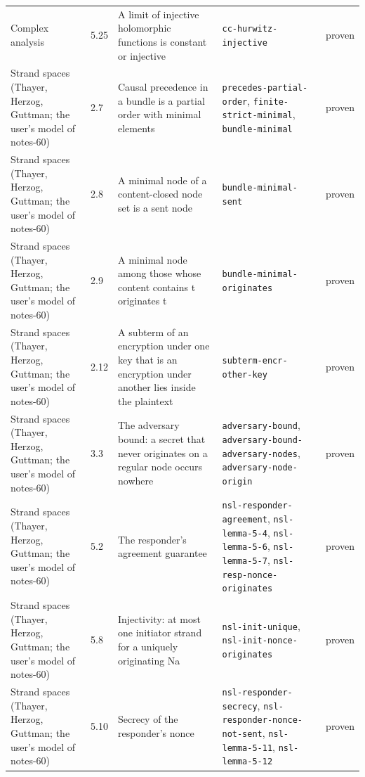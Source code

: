 \begin{longtable}{@{}ll>{\raggedright\arraybackslash}p{4.2cm}>{\raggedright\arraybackslash}p{4.2cm}l@{}}
Complex analysis & 5.25 & A limit of injective holomorphic functions is constant or injective & \texttt{cc-\allowbreak{}hurwitz-\allowbreak{}injective} & proven \\
Strand spaces (Thayer, Herzog, Guttman; the user's model of notes-60) & 2.7 & Causal precedence in a bundle is a partial order with minimal elements & \texttt{precedes-\allowbreak{}partial-\allowbreak{}order}, \texttt{finite-\allowbreak{}strict-\allowbreak{}minimal}, \texttt{bundle-\allowbreak{}minimal} & proven \\
Strand spaces (Thayer, Herzog, Guttman; the user's model of notes-60) & 2.8 & A minimal node of a content-closed node set is a sent node & \texttt{bundle-\allowbreak{}minimal-\allowbreak{}sent} & proven \\
Strand spaces (Thayer, Herzog, Guttman; the user's model of notes-60) & 2.9 & A minimal node among those whose content contains t originates t & \texttt{bundle-\allowbreak{}minimal-\allowbreak{}originates} & proven \\
Strand spaces (Thayer, Herzog, Guttman; the user's model of notes-60) & 2.12 & A subterm of an encryption under one key that is an encryption under another lies inside the plaintext & \texttt{subterm-\allowbreak{}encr-\allowbreak{}other-\allowbreak{}key} & proven \\
Strand spaces (Thayer, Herzog, Guttman; the user's model of notes-60) & 3.3 & The adversary bound: a secret that never originates on a regular node occurs nowhere & \texttt{adversary-\allowbreak{}bound}, \texttt{adversary-\allowbreak{}bound-\allowbreak{}adversary-\allowbreak{}nodes}, \texttt{adversary-\allowbreak{}node-\allowbreak{}origin} & proven \\
Strand spaces (Thayer, Herzog, Guttman; the user's model of notes-60) & 5.2 & The responder's agreement guarantee & \texttt{nsl-\allowbreak{}responder-\allowbreak{}agreement}, \texttt{nsl-\allowbreak{}lemma-\allowbreak{}5-\allowbreak{}4}, \texttt{nsl-\allowbreak{}lemma-\allowbreak{}5-\allowbreak{}6}, \texttt{nsl-\allowbreak{}lemma-\allowbreak{}5-\allowbreak{}7}, \texttt{nsl-\allowbreak{}resp-\allowbreak{}nonce-\allowbreak{}originates} & proven \\
Strand spaces (Thayer, Herzog, Guttman; the user's model of notes-60) & 5.8 & Injectivity: at most one initiator strand for a uniquely originating Na & \texttt{nsl-\allowbreak{}init-\allowbreak{}unique}, \texttt{nsl-\allowbreak{}init-\allowbreak{}nonce-\allowbreak{}originates} & proven \\
Strand spaces (Thayer, Herzog, Guttman; the user's model of notes-60) & 5.10 & Secrecy of the responder's nonce & \texttt{nsl-\allowbreak{}responder-\allowbreak{}secrecy}, \texttt{nsl-\allowbreak{}responder-\allowbreak{}nonce-\allowbreak{}not-\allowbreak{}sent}, \texttt{nsl-\allowbreak{}lemma-\allowbreak{}5-\allowbreak{}11}, \texttt{nsl-\allowbreak{}lemma-\allowbreak{}5-\allowbreak{}12} & proven \\

\end{longtable}

